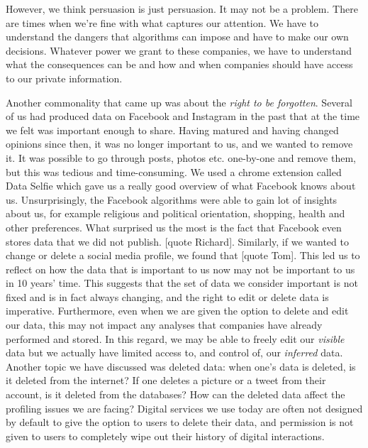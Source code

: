 \documentclass[format=acmsmall, review=false, screen=true]{acmart}
\begin{document}
However, we think persuasion is just persuasion. It may not be a problem. There are times when we’re fine with what captures our attention. We have to understand the dangers that algorithms can impose and have to make our own decisions. Whatever power we grant to these companies, we have to understand what the consequences can be and how and when companies should have access to our private information.
 
Another commonality that came up was about the \textit{right to be forgotten}. Several of us had produced data on Facebook and Instagram in the past that at the time we felt was important enough to share. Having matured and having changed opinions since then, it was no longer important to us, and we wanted to remove it. It was possible to go through posts, photos etc. one-by-one and remove them, but this was tedious and time-consuming. We used a chrome extension called Data Selfie which gave us a really good overview of what Facebook knows about us. Unsurprisingly, the Facebook algorithms were able to gain lot of insights about us, for example religious and political orientation, shopping, health and other preferences. What surprised us the most is the fact that Facebook even stores data that we did not publish.  [quote Richard]. Similarly, if we wanted to change or delete a social media profile, we found that  [quote Tom]. This led us to reflect on how the data that is important to us now may not be important to us in 10 years’ time. This suggests that the set of data we consider important is not fixed and is in fact always changing, and the right to edit or delete data is imperative. Furthermore, even when we are given the option to delete and edit our data, this may not impact any analyses that companies have already performed and stored. In this regard, we may be able to freely edit our \textit{visible} data but we actually have limited access to, and control of, our \textit{inferred} data.
Another topic we have discussed was deleted data: when one’s data is deleted, is it deleted from the internet? If one deletes a picture or a tweet from their account, is it deleted from the databases? How can the deleted data affect the profiling issues we are facing? Digital services we use today are often not designed by default to give the option to users to delete their data, and permission is not given to users to completely wipe out their history of digital interactions.
\end{document}
